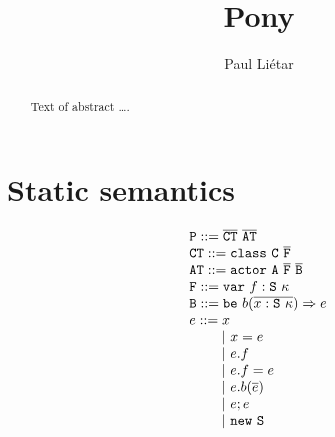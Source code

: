 \documentclass[format=acmsmall, authordraft, authorversion]{acmart}\settopmatter{printfolios=true,printccs=false,printacmref=false}
\newcommand{\seq}[1]{\overline{#1}}
\begin{document}
\title{Pony}
\author{Paul Li\'etar}

\begin{abstract}
Text of abstract \ldots.
\end{abstract}

\maketitle

\section{Static semantics}

\[ \begin{array}[t]{l@{\hspace{2mm}}l}
\mathtt{P} ::= \seq{\mathtt{CT}}\ \seq{\mathtt{AT}}\\
\mathtt{CT} ::= \mathtt{class}\ \mathtt{C}\ \seq{\mathtt{F}}\\
\mathtt{AT} ::= \mathtt{actor}\ \mathtt{A}\ \seq{\mathtt{F}}\ \seq{\mathtt{B}}\\
\mathtt{F} ::= \mathtt{var}\ f : \mathtt{S}\ \kappa\\
\mathtt{B} ::= \mathtt{be}\ b(\seq{x: \mathtt{S}\ \kappa}) \Rightarrow e\\
e ::= x \\
\qquad ~|~ x = e \\
\qquad ~|~ e.f \\
\qquad ~|~ e.f = e \\
\qquad ~|~ e.b(\seq{e}) \\
\qquad ~|~ e ; e\\
\qquad ~|~ \mathtt{new}\ \mathtt{S}
\end{array} \]
\end{document}
